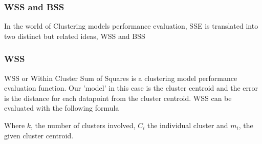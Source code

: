 \documentclass[11pt]{article}
\begin{document}
			\subsubsection*{WSS and BSS}
				In the world of Clustering models performance evaluation, SSE is translated into two distinct but related ideas\cite{???}, WSS and BSS

			\subsubsection*{WSS}
				WSS or  Within Cluster Sum of Squares is a clustering model performance evaluation function. Our 'model' in this case is the cluster centroid and the error is the distance for each datapoint from the cluster centroid. WSS can be evaluated with the following formula\cite{???}

				Where $k$, the number of clusters involved, $C_i$ the individual cluster and $m_i$, the given cluster centroid.
\end{document}
